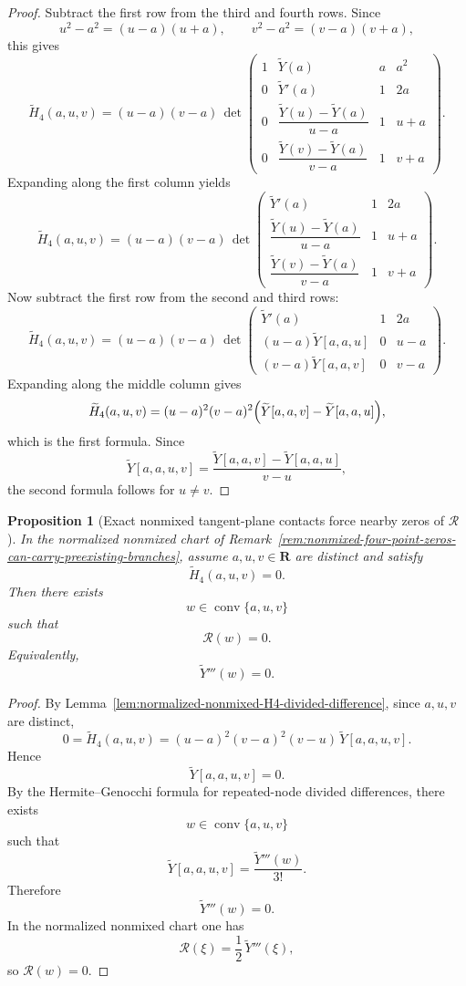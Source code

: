 \documentclass[11pt,a4paper]{amsart}
\theoremstyle{plain}
\newtheorem{proposition}[theorem]{Proposition}
\theoremstyle{definition}
\begin{document}
\begin{proof}
Subtract the first row from the third and fourth rows. Since
\[
u^2-a^2=(u-a)(u+a),
\qquad
v^2-a^2=(v-a)(v+a),
\]
this gives
\[
\widetilde H_4(a,u,v)
=
(u-a)(v-a)\,
\det\!\begin{pmatrix}
1&\widetilde Y(a)&a&a^2\\
0&\widetilde Y'(a)&1&2a\\
0&\dfrac{\widetilde Y(u)-\widetilde Y(a)}{u-a}&1&u+a\\
0&\dfrac{\widetilde Y(v)-\widetilde Y(a)}{v-a}&1&v+a
\end{pmatrix}.
\]
Expanding along the first column yields
\[
\widetilde H_4(a,u,v)
=
(u-a)(v-a)\,
\det\!\begin{pmatrix}
\widetilde Y'(a)&1&2a\\
\dfrac{\widetilde Y(u)-\widetilde Y(a)}{u-a}&1&u+a\\
\dfrac{\widetilde Y(v)-\widetilde Y(a)}{v-a}&1&v+a
\end{pmatrix}.
\]
Now subtract the first row from the second and third rows:
\[
\widetilde H_4(a,u,v)
=
(u-a)(v-a)\,
\det\!\begin{pmatrix}
\widetilde Y'(a)&1&2a\\
(u-a)\widetilde Y[a,a,u]&0&u-a\\
(v-a)\widetilde Y[a,a,v]&0&v-a
\end{pmatrix}.
\]
Expanding along the middle column gives
\[
\widetilde H_4(a,u,v)
=
(u-a)^2(v-a)^2\Bigl(\widetilde Y[a,a,v]-\widetilde Y[a,a,u]\Bigr),
\]
which is the first formula. Since
\[
\widetilde Y[a,a,u,v]
=
\frac{\widetilde Y[a,a,v]-\widetilde Y[a,a,u]}{v-u},
\]
the second formula follows for $u\neq v$.
\end{proof}

\begin{proposition}[Exact nonmixed tangent-plane contacts force nearby zeros of $\mathcal R$]
\label{prop:exact-nonmixed-tangent-plane-contacts-force-R-zero}
In the normalized nonmixed chart of
Remark~\ref{rem:nonmixed-four-point-zeros-can-carry-preexisting-branches},
assume $a,u,v\in\mathbf R$ are distinct and satisfy
\[
\widetilde H_4(a,u,v)=0.
\]
Then there exists
\[
w\in \operatorname{conv}\{a,u,v\}
\]
such that
\[
\mathcal R(w)=0.
\]
Equivalently,
\[
\widetilde Y'''(w)=0.
\]
\end{proposition}

\begin{proof}
By Lemma~\ref{lem:normalized-nonmixed-H4-divided-difference}, since
$a,u,v$ are distinct,
\[
0=\widetilde H_4(a,u,v)
=
(u-a)^2(v-a)^2(v-u)\,\widetilde Y[a,a,u,v].
\]
Hence
\[
\widetilde Y[a,a,u,v]=0.
\]
By the Hermite--Genocchi formula for repeated-node divided differences, there
exists
\[
w\in \operatorname{conv}\{a,u,v\}
\]
such that
\[
\widetilde Y[a,a,u,v]=\frac{\widetilde Y'''(w)}{3!}.
\]
Therefore
\[
\widetilde Y'''(w)=0.
\]
In the normalized nonmixed chart one has
\[
\mathcal R(\xi)=\frac12\,\widetilde Y'''(\xi),
\]
so $\mathcal R(w)=0$.
\end{proof}
\end{document}
